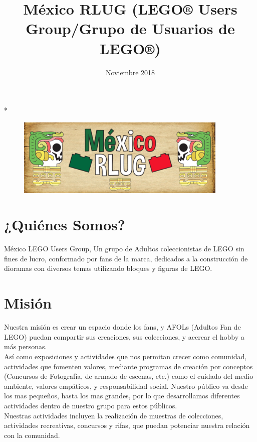 \documentclass[]{article}
\title{México RLUG (LEGO® Users Group/Grupo de Usuarios de LEGO®)}
\date{Noviembre 2018}
\begin{document}
\maketitle



*\begin{figure}[h!]
	\centering
	\includegraphics[width=0.9\textwidth]{BannerA}
\end{figure}




\section{¿Quiénes Somos?}

México LEGO Users Group, Un grupo de Adultos coleccionistas de LEGO sin fines de lucro, conformado por fans de la marca, dedicados a la construcción de dioramas con diversos temas utilizando bloques y figuras de LEGO.

\section{Misión}

Nuestra misión es crear un espacio donde los fans, y AFOLs (Adultos Fan de LEGO) puedan compartir sus creaciones, sus colecciones, y acercar el hobby a más personas.\\

Así como exposiciones y actividades que nos permitan crecer como comunidad, actividades que fomenten valores, mediante programas de creación por conceptos (Concursos de Fotografía, de armado de escenas, etc.) como el cuidado del medio ambiente, valores empáticos, y responsabilidad social.
Nuestro público va desde los mas pequeños, hasta los mas grandes, por lo que desarrollamos diferentes actividades dentro de nuestro grupo para estos públicos.\\

Nuestras actividades incluyen la realización de muestras de colecciones, actividades recreativas, concursos y rifas, que puedan potenciar nuestra relación con la comunidad.
\end{document}

